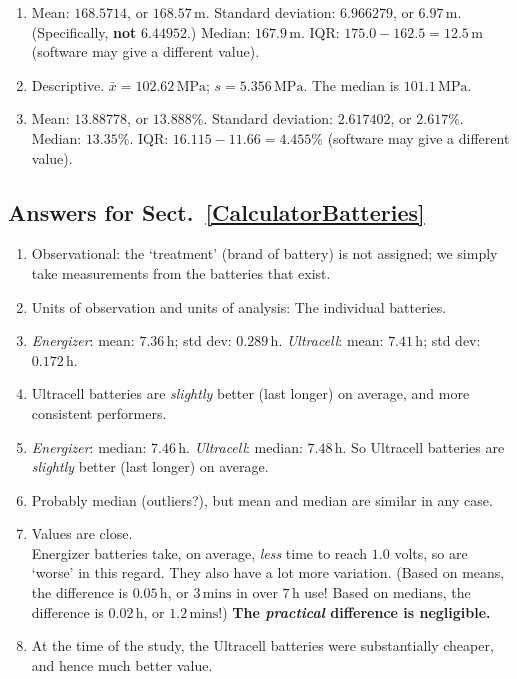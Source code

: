 \documentclass[
  11pt,
  a4paper,
  krantz2]{krantz}
\providecommand{\tightlist}{%
  \setlength{\itemsep}{0pt}\setlength{\parskip}{0pt}}
\begin{document}
\begin{footnotesize}
\begin{enumerate}
\def\labelenumi{\arabic{enumi}.}
\tightlist
\item
  Mean: \(168.5714\), or \(168.57\,\text{m}\).
  Standard deviation: \(6.966279\), or \(6.97\,\text{m}\).
  (Specifically, \textbf{not} \(6.44952\).)
  Median: \(167.9\,\text{m}\).
  IQR: \(175.0 - 162.5 = 12.5\,\text{m}\) (software may give a different value).
\item
  Descriptive.
  \(\bar{x} = 102.62\,\text{MPa}\); \(s = 5.356\,\text{MPa}\).
  The median is \(101.1\,\text{MPa}\).
\item
  Mean: \(13.88778\), or \(13.888\)\%.
  Standard deviation: \(2.617402\), or \(2.617\)\%.
  Median: \(13.35\)\%.
  IQR: \(16.115 - 11.66 = 4.455\)\% (software may give a different value).
\end{enumerate}

\subsection*{Answers for Sect.~\ref{CalculatorBatteries}}\label{answers-for-sect.-refcalculatorbatteries}

\begin{enumerate}
\def\labelenumi{\arabic{enumi}.}
\tightlist
\item
  Observational: the `treatment' (brand of battery) is not assigned; we simply take measurements from the batteries that exist.
\item
  Units of observation and units of analysis: The individual batteries.
\item
  \emph{Energizer}: mean: \(7.36\,\text{h}\); std dev: \(0.289\,\text{h}\).
  \emph{Ultracell}: mean: \(7.41\,\text{h}\); std dev: \(0.172\,\text{h}\).
\item
  Ultracell batteries are \emph{slightly} better (last longer) on average, and more consistent performers.
\item
  \emph{Energizer}: median: \(7.46\,\text{h}\).
  \emph{Ultracell}: median: \(7.48\,\text{h}\).
  So Ultracell batteries are \emph{slightly} better (last longer) on average.
\item
  Probably median (outliers?), but mean and median are similar in any case.
\item
  Values are close.\\
  Energizer batteries take, on average, \emph{less} time to reach \(1.0\) volts, so are `worse' in this regard.
  They also have a lot more variation.
  (Based on means, the difference is \(0.05\,\text{h}\), or \(3\,\text{mins}\) in over \(7\,\text{h}\) use!
  Based on medians, the difference is \(0.02\,\text{h}\), or \(1.2\,\text{mins}\)!)
  \textbf{The \emph{practical} difference is negligible.}
\item
  At the time of the study, the Ultracell batteries were substantially cheaper, and hence much better value.
\end{enumerate}


\end{footnotesize}
\end{document}
